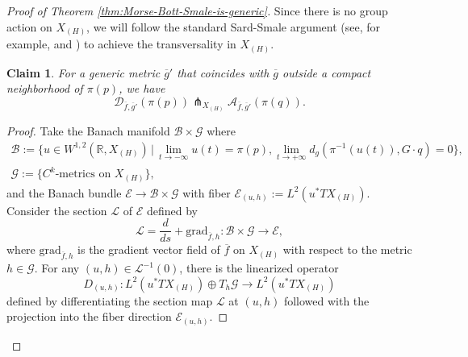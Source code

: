 \documentclass[11pt]{amsart}
\newtheorem{claim}[theorem]{Claim}
\theoremstyle{definition}
\numberwithin{equation}{subsection}
\newcommand{\des}{\mathscr{D}}
\newcommand{\asc}{\mathscr{A}}
\begin{document}
\begin{proof}[Proof of Theorem \ref{thm:Morse-Bott-Smale-is-generic}]
Since there is no group action on $X_{(H)}$, we will follow the standard Sard-Smale argument (see, for example, \cite[Proposition~5.8]{hutchings2002lecture} and \cite[Theorem~3.3]{salamonMorse}) to achieve the transversality in $X_{(H)}$.

\begin{claim}\label{claim:perturbationMH}
   For a generic metric $\overline{g}'$ that coincides with $\overline{g}$ outside a compact neighborhood of $\pi(p)$, we have 
   \[\des_{\overline{f},\overline{g}'}(\pi(p))\pitchfork_{X_{(H)}}\asc_{\overline{f},\overline{g}'}(\pi(q)).\]

\end{claim}
\begin{proof}
    

Take the Banach manifold $\mathcal{B}\times \mathcal{G}$ where
  \begin{gather*}
       \mathcal{B}:=\{u\in W^{1,2}(\mathbb{R},X_{(H)})\,|\,\lim_{t\rightarrow-\infty}u(t)=\pi(p),\lim_{t\rightarrow+\infty}d_g(\pi^{-1}(u(t)),G\cdot q)=0\},\\
    \mathcal{G}:=\{C^k\text{-metrics on }X_{(H)}\},
   \end{gather*}
   and the Banach bundle $\mathcal{E}\rightarrow \mathcal{B}\times \mathcal{G}$ with fiber $\mathcal{E}_{(u,h)}:=L^2(u^*TX_{(H)})$. Consider the section $\mathcal{L}$ of $\mathcal{E}$ defined by \[\mathcal{L}=\frac{d}{ds}+\text{grad}_{\overline{f},h}:\mathcal{B}\times\mathcal{G}\rightarrow\mathcal{E},\]where $\text{grad}_{\overline{f},h}$ is the gradient vector field of $\overline{f}$ on $X_{(H)}$ with respect to the metric $h\in\mathcal{G}$. For any $(u,h)\in\mathcal{L}^{-1}(0)$, there is the linearized operator
   \[D_{(u,h)}:L^2(u^*TX_{(H)})\oplus T_h\mathcal{G}\rightarrow L^2(u^*TX_{(H)})\] defined by differentiating the section map $\mathcal{L}$ at $(u,h)$ followed with the  projection into the fiber direction $\mathcal{E}_{(u,h)}$.  
   

\end{proof}
\end{proof}
\end{document}
